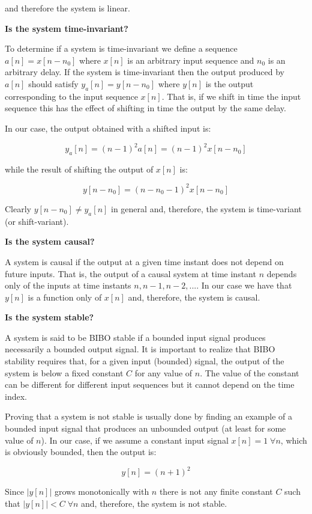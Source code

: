 \documentclass[11pt]{article}
\begin{document}
\noindent and therefore the system is linear.



\textbf{Is the system time-invariant?}

To determine if a system is time-invariant we define a sequence $a[n]=x[n-n_0]$ where $x[n]$ is an arbitrary input sequence and $n_0$ is an arbitrary delay. If the system is time-invariant then the output produced by $a[n]$ should satisfy $y_{a}[n]=y[n-n_0]$ where $y[n]$ is the output corresponding to the input sequence $x[n]$. That is, if we shift in time the input sequence this has the effect of shifting in time the output by the same delay. 

In our case, the output obtained with a shifted input is:

\[
y_a[n] = (n-1)^2 a[n]=(n-1)^2 x[n-n_0]
\]

\noindent while the result of shifting the output of $x[n]$ is:

\[
y[n-n_0]= (n-n_0-1)^2 x[n-n_0]
\]

Clearly $y[n-n_0]\neq y_a[n]$ in general and, therefore, the system is time-variant (or shift-variant).


\textbf{Is the system causal?}

A system is causal if the output at a given time instant does not depend on future inputs. That is, the output of a causal system at time instant $n$ depends only of the inputs at time instants $n,n-1,n-2,...$. In our case we have that $y[n]$ is a function only of $x[n]$ and, therefore, the system is causal.


\textbf{Is the system stable?}

A system is said to be BIBO stable if a bounded input signal produces necessarily a bounded output signal. It is important to realize that BIBO stability requires that, for a given input (bounded) signal, the output of the system is below a fixed constant $C$ for any value of $n$. The value of the constant can be different for different input sequences but it cannot depend on the time index. 

Proving that a system is not stable is usually done by finding an example of a bounded input signal that produces an unbounded output (at least for some value of $n$). In our case, if we assume a constant input signal $x[n]=1 \;\forall n$, which is obviously bounded, then the output is:

\[
y[n] = (n+1)^2
\]

Since $|y[n]|$ grows monotonically with $n$ there is not any finite constant $C$ such that $|y[n]|<C\;\forall n$ and, therefore, the system is not stable.
\end{document}
